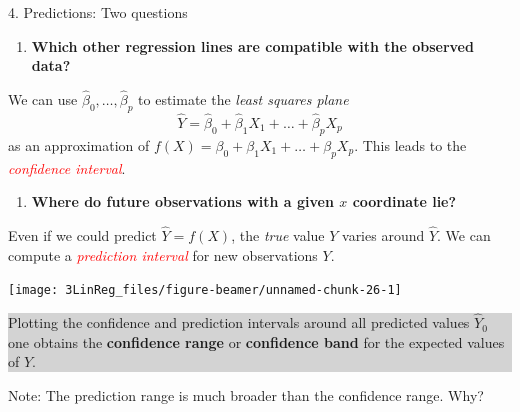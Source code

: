 \documentclass[10pt,ignorenonframetext,]{beamer}
\providecommand{\tightlist}{%
  \setlength{\itemsep}{0pt}\setlength{\parskip}{0pt}}
\begin{document}
\begin{frame}

\begin{block}{4. Predictions: Two questions}

\begin{enumerate}
\def\labelenumi{\arabic{enumi}.}
\tightlist
\item
  \textbf{Which other regression lines are compatible with the observed
  data?}
\end{enumerate}

We can use \(\hat\beta_0, \ldots , \hat\beta_p\) to estimate the
\emph{least squares plane}
\[\hat{Y} = \hat\beta_0 + \hat\beta_1 X_1 + \ldots + \hat\beta_p X_p \]
as an approximation of
\(f(X) = \beta_0 + \beta_1 X_1 + \ldots + \beta_p X_p.\) This leads to
the \emph{\textcolor{red}{confidence interval}}.

\vspace{4mm}

\begin{enumerate}
\def\labelenumi{\arabic{enumi}.}
\setcounter{enumi}{1}
\tightlist
\item
  \textbf{Where do future observations with a given \(x\) coordinate
  lie?}
\end{enumerate}

Even if we could predict \(\hat{Y}=f(X)\), the \emph{true} value \(Y\)
varies around \(\hat{Y}\). We can compute a
\emph{\textcolor{red}{prediction interval}} for new observations \(Y\).

\end{block}

\end{frame}

\begin{frame}

\begin{center}\texttt{[image: 3LinReg\_files/figure-beamer/unnamed-chunk-26-1]} \end{center}

\colorbox{lightgray}{\begin{minipage}{10cm}

Plotting the confidence and prediction intervals around all predicted values $\hat Y_0$ one obtains the {\bf confidence range} or {\bf confidence band} for the expected values of $Y$.
\end{minipage}}

Note: The prediction range is much broader than the confidence range.
Why?

\end{frame}
\end{document}
